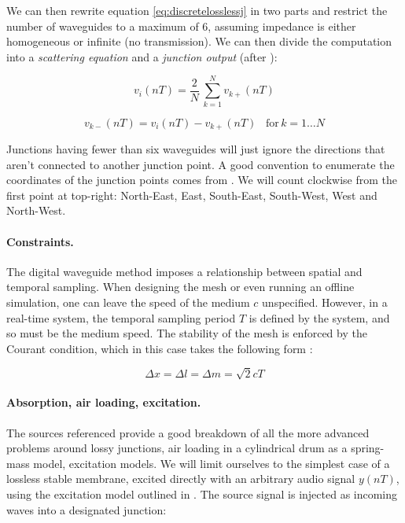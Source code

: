 \documentclass{article}
\begin{document}
We can then rewrite equation \ref{eq:discretelosslessj} in two
parts and restrict the number of waveguides to a maximum of 6,
assuming impedance is either homogeneous or infinite (no transmission).
We can then divide the computation into a \emph{scattering equation}
and a \emph{junction output} (after \cite{murphy2000digital}):

\begin{equation}\label{eq:scatter}
    v_{i}(nT) = \frac{2}{N}\,\sum_{k=1}^{N}v_{k+}(nT)
\end{equation}

\begin{equation}\label{eq:output}
    v_{k-}(nT) = v_{i}(nT) - v_{k+}(nT) \,\,\,\,\, \mbox{for}\, k = {1 \dots N}
\end{equation}

Junctions having fewer than six waveguides will just ignore
the directions that aren't connected to another junction point.
A good convention to enumerate the coordinates of the junction
points comes from \cite{murphy2000digital}. We will count clockwise
from the first point at top-right: North-East, East, South-East,
South-West, West and North-West.


\paragraph{Constraints.}
The digital waveguide method imposes a relationship between spatial
and temporal sampling. When designing the mesh or even running
an offline simulation, one can leave the speed of the medium
\(c\) unspecified. However, in a real-time system, the temporal
sampling period \(T\) is defined by the system, and so must be the
medium speed. The stability of the mesh is enforced by the
Courant condition, which in this case takes the following
form \cite{fontana1998physical}:

\begin{equation}
\Delta x = \Delta l = \Delta m = \sqrt{2}cT
\end{equation}\label{eq:courant}


\paragraph{Absorption, air loading, excitation.}
The sources referenced provide a good breakdown of all the more
advanced problems around lossy junctions, air loading in
a cylindrical drum as a spring-mass model, excitation models.
We will limit ourselves to the simplest case of a lossless
stable membrane, excited directly with an arbitrary audio signal
\(y(nT)\), using the excitation model outlined
in \cite{murphy2000digital}. The source signal is injected as incoming
waves into a designated junction:
\end{document}
